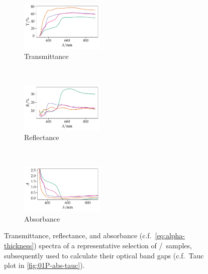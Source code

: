 \documentclass[draft,webedition,openright,titles,swedish,english]{LuaUUThesis}\usepackage[]{graphicx}\usepackage[]{xcolor}
\newenvironment{knitrout}{}{} %
\newcommand{\cf}{c.f.}
\begin{document}
\begin{figure}[tbp]
\centering
\begin{subfigure}[b]{0.32\textwidth}
\centering
\begin{knitrout}\scriptsize
{}\color{fgcolor}

{\centering \includegraphics[width=1.57in]{figure/0501P-fig-uvvisir-transmittance-1} 

}


\end{knitrout}
\caption{Transmittance}
\label{fig:P01-uvvisir-transmittance}
\end{subfigure}%
\,%
\begin{subfigure}[b]{0.32\textwidth}
\centering
\begin{knitrout}\scriptsize
{}\color{fgcolor}

{\centering \includegraphics[width=1.57in]{figure/0501P-fig-uvvisir-reflectance-1} 

}


\end{knitrout}
\caption{Reflectance}
\label{fig:P01-uvvisir-reflectance}
\end{subfigure}%
\,%
\begin{subfigure}[b]{0.32\textwidth}
\centering
\begin{knitrout}\scriptsize
{}\color{fgcolor}

{\centering \includegraphics[width=1.57in]{figure/0501P-fig-uvvisir-absorbance-1} 

}


\end{knitrout}
\caption{Absorbance}
\label{fig:P01-uvvisir-absorbance}
\end{subfigure}%
\caption[Optical spectra of ZnO/CdS nanorod arrays]{%
   Transmittance, reflectance, and absorbance (\cf\ \cref{eq:alpha-thickness}) spectra
   of a representative selection of \ZnO/\CdS\ samples, subsequently used
   to calculate their optical band gaps (\cf\ Tauc plot in \cref{fig:01P-abs-tauc}).}
\label{fig:P01-uvvisir}
\end{figure}
\end{document}
